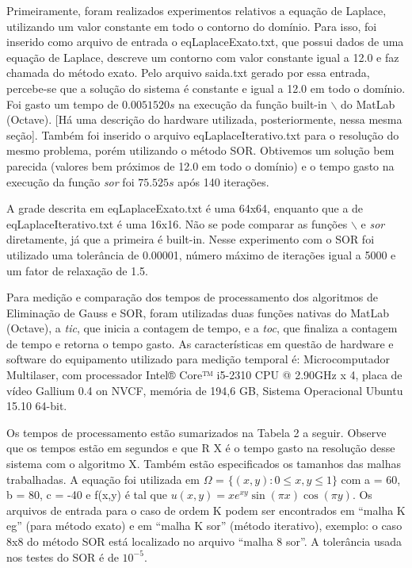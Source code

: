 \documentclass[
	article,			%
	11pt,				%
	oneside,			%
	a4paper,			%
	english,			%
	brazil,				%
	sumario=tradicional
	]{abntex2}
\begin{document}
Primeiramente, foram realizados experimentos relativos a equação de Laplace, utilizando um valor constante em todo o contorno
do domínio. Para isso, foi inserido como arquivo de entrada o eqLaplaceExato.txt, que possui dados de uma equação de Laplace, 
descreve um contorno com valor constante igual a  12.0 e faz chamada do método exato. Pelo arquivo saida.txt gerado por essa
entrada, percebe-se que a solução do sistema é constante e igual a 12.0 em todo o domínio. Foi gasto um tempo de $ 0.0051520 s $
na execução da função built-in $ \backslash $ do MatLab (Octave). [Há uma descrição do hardware utilizada, posteriormente,
nessa mesma seção]. Também foi inserido o arquivo eqLaplaceIterativo.txt para o resolução do mesmo problema, porém utilizando o método SOR. Obtivemos
um solução bem parecida (valores bem próximos de 12.0 em todo o domínio) e o tempo gasto na execução da função \emph{sor} foi
$ 75.525 s $ após 140 iterações.

A grade descrita em eqLaplaceExato.txt é uma 64x64, enquanto que a de eqLaplaceIterativo.txt é uma 16x16. Não se pode comparar
as funções $ \backslash $ e \emph{sor} diretamente, já que a primeira é built-in. Nesse experimento com o SOR foi utilizado uma
tolerância de 0.00001, número máximo de iterações igual a 5000 e um fator de relaxação de 1.5.

Para medição e comparação dos tempos de processamento dos algoritmos de Eliminação de Gauss e SOR, foram utilizadas duas funções
nativas do MatLab (Octave), a \emph{tic}, que inicia a contagem de tempo, e a \emph{toc}, que finaliza a contagem de tempo e retorna
o tempo gasto. As características em questão de hardware e software do equipamento utilizado para medição temporal é: 
Microcomputador Multilaser, com processador Intel® Core™ i5-2310 CPU @ 2.90GHz x 4,
placa de vídeo Gallium 0.4 on NVCF, memória de 194,6 GB, Sistema Operacional Ubuntu 15.10 64-bit.

Os tempos de processamento estão sumarizados na Tabela 2 a seguir. Observe que os tempos estão em segundos e que R X é o tempo gasto na resolução desse sistema com o algoritmo X. Também estão especificados os tamanhos das malhas trabalhadas. A equação foi utilizada em $\Omega$ = $\{(x,y) : 0 \leq x,y \leq 1\}$ com a = 60, b = 80, c = -40 e f(x,y) é tal que $u(x,y)=x e^{xy} \sin (\pi x) \cos (\pi y)$. Os arquivos de entrada para o caso de ordem K podem ser encontrados em ``malha K eg'' (para método exato) e em ``malha K sor'' (método iterativo), exemplo: o caso 8x8 do método SOR está localizado no arquivo ``malha 8 sor''. A tolerância usada nos testes do SOR é de $10^{-5}$.
\end{document}

